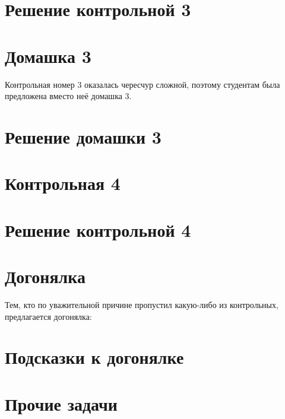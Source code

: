\documentclass[11pt, openany]{book}
\numberwithin{equation}{page} %
\theoremstyle{definition} %
\theoremstyle{definition}
\theoremstyle{definition}
\begin{document}
\section{Решение контрольной 3}



\section{Домашка 3}

Контрольная номер 3 оказалась чересчур сложной, поэтому студентам была предложена вместо неё домашка 3.




\section{Решение домашки 3}






\section{Контрольная 4}



\section{Решение контрольной 4}




\section{Догонялка}

Тем, кто по уважительной причине пропустил какую-либо из контрольных, предлагается догонялка:



\section{Подсказки к догонялке}



\section{Прочие задачи}
\end{document}
